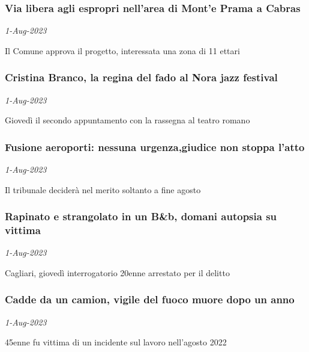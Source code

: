 \subsubsection{Via libera agli espropri nell'area di Mont'e Prama a Cabras \href{https://www.ansa.it/sardegna/notizie/2023/08/01/via-libera-agli-espropri-nellarea-di-monte-prama-a-cabras_ee859f2c-6a14-4476-9f4a-980aa018264c.html}{}}
\textit{1-Aug-2023}

Il Comune approva il progetto, interessata una zona di 11 ettari
\subsubsection{Cristina Branco, la regina del fado al Nora jazz festival \href{https://www.ansa.it/sardegna/notizie/2023/08/01/cristina-branco-la-regina-del-fado-al-nora-jazz-festival_cb5e84cf-8908-4153-b814-39493781b097.html}{}}
\textit{1-Aug-2023}

Gioved\`{i} il secondo appuntamento con la rassegna al teatro romano
\subsubsection{Fusione aeroporti: nessuna urgenza,giudice non stoppa l'atto \href{https://www.ansa.it/sardegna/notizie/2023/08/01/fusione-aeroporti-nessuna-urgenzagiudice-non-stoppa-latto_d0c5d9e9-1e6a-465f-9dbd-6e6917e74cd8.html}{}}
\textit{1-Aug-2023}

Il tribunale decider\`{a} nel merito soltanto a fine agosto
\subsubsection{Rapinato e strangolato in un B\&b, domani autopsia su vittima \href{https://www.ansa.it/sardegna/notizie/2023/08/01/rapinato-e-strangolato-in-un-bb-domani-autopsia-su-vittima_d0040e62-496d-4470-8520-ab205a902782.html}{}}
\textit{1-Aug-2023}

Cagliari, gioved\`{i} interrogatorio 20enne arrestato per il delitto
\subsubsection{Cadde da un camion, vigile del fuoco muore dopo un anno \href{https://www.ansa.it/sardegna/notizie/2023/08/01/cadde-da-un-camion-vigile-del-fuoco-muore-dopo-un-anno_79777c42-2717-417c-a280-21065ba5815c.html}{}}
\textit{1-Aug-2023}

45enne fu vittima di un incidente sul lavoro nell'agosto 2022
